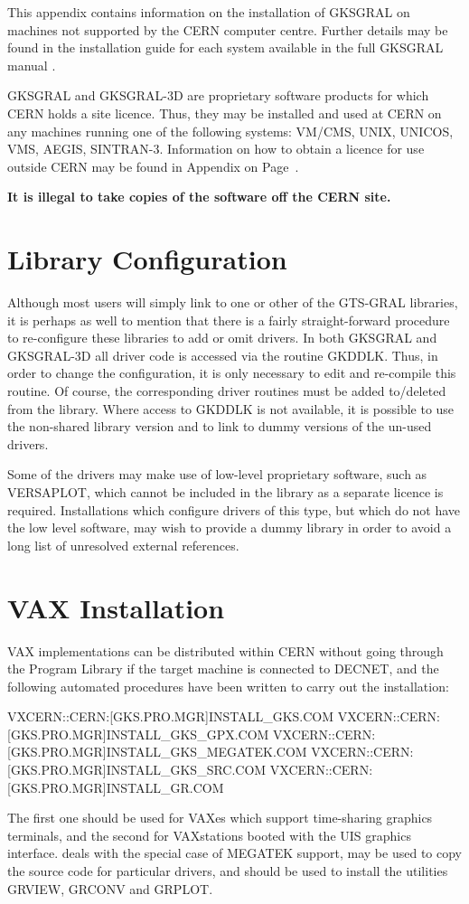 This appendix contains information on the installation of GKSGRAL on
machines not supported by the CERN computer centre.
Further details may be found in the installation guide for each
system available in the full GKSGRAL manual \cite{bib-gtsref}.
\begin{note}
GKSGRAL and GKSGRAL-3D are proprietary software products for which CERN
holds a site licence. Thus, they may be installed and used at CERN
on any machines running one of the following systems:
VM/CMS, UNIX, UNICOS, VMS, AEGIS, SINTRAN-3.
Information on how to obtain a licence for use outside CERN may be
found in Appendix on Page~\pageref{sec:gtsdist}.
 
{\bf It is illegal to take copies of the software off the CERN site.}
\end{note}
\section{Library Configuration}
 
Although most users will simply link to one or other of the GTS-GRAL
libraries, it is perhaps as well to mention that there is a fairly
straight-forward procedure to re-configure these libraries to add
or omit drivers. In both GKSGRAL and GKSGRAL-3D all driver code
is accessed via the routine GKDDLK. Thus, in order to change the configuration,
it is only necessary to edit and re-compile this routine. Of course,
the corresponding driver routines must be added to/deleted from the library.
Where access to GKDDLK is not available, it is possible to use the
non-shared library version and to link to dummy versions of the
un-used drivers.
 
Some of the drivers may make use of low-level proprietary software,
such as VERSAPLOT,
which cannot be included in the library as a separate licence is required.
Installations which configure drivers of this type, but which do not
have the low level software, may wish to provide a dummy library in order to
avoid a long list of unresolved external references.
\section{VAX Installation}
VAX implementations can be distributed within CERN without going through the
Program Library if the target machine is connected to DECNET, and the following
automated procedures have been written to carry out the installation:
\begin{XMP}
VXCERN::CERN:[GKS.PRO.MGR]INSTALL_GKS.COM
VXCERN::CERN:[GKS.PRO.MGR]INSTALL_GKS_GPX.COM
VXCERN::CERN:[GKS.PRO.MGR]INSTALL_GKS_MEGATEK.COM
VXCERN::CERN:[GKS.PRO.MGR]INSTALL_GKS_SRC.COM
VXCERN::CERN:[GKS.PRO.MGR]INSTALL_GR.COM
\end{XMP}
The first one should be used for VAXes which support time-sharing graphics
terminals, and the second for VAXstations booted with the UIS
graphics interface.
 deals with the special case of MEGATEK support,
may be used to copy the source code for particular drivers,
and 
should be used to install the utilities GRVIEW, GRCONV and GRPLOT.
 
